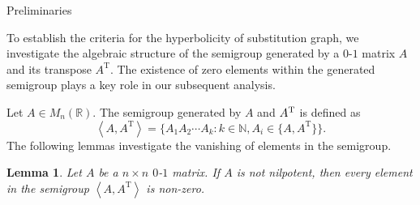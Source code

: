 \documentclass[reqno]{amsart}
\makeatletter
\theoremstyle{plain}
\newtheorem{lemma}{Lemma}
\numberwithin{equation}{section}
\renewcommand{\subsection}{\@startsection{subsection}{2}  \z@{.5\linespacing\@plus.7\linespacing}{.5\linespacing}  {\normalfont\bfseries}}
\makeatother
\begin{document}
\bigskip

\subsection{Preliminaries}

To establish the criteria for the hyperbolicity of substitution graph, we
investigate the algebraic structure of the semigroup generated by a $0$-$1$
matrix $A$ and its transpose $A^{\mathrm{T}}$. The existence of zero
elements within the generated semigroup plays a key role in our subsequent
analysis.

Let $A\in M_{n}(\mathbb{R})$. The semigroup generated by $A$ and $A^{\mathrm{%
T}}$ is defined as 
\begin{equation*}
\left\langle A,A^{\mathrm{T}}\right\rangle =\{A_{1}A_{2}\cdots A_{k}:k\in 
\mathbb{N},A_{i}\in \{A,A^{\mathrm{T}}\}\}.
\end{equation*}%
The following lemmas investigate the vanishing of elements in the semigroup.

\begin{lemma}
\label{le-A1Ak}Let $A$ be a $n\times n$ $0$-$1$ matrix. If $A$ is not
nilpotent, then every element in the semigroup $\left\langle A,A^{\mathrm{T}%
}\right\rangle $ is non-zero.
\end{lemma}
\end{document}
